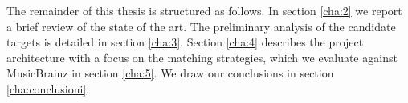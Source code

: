 The remainder of this thesis is structured as follows. In section \ref{cha:2} we report a brief review of the state of the art. The preliminary analysis of the candidate targets is detailed in section \ref{cha:3}. Section \ref{cha:4} describes the project architecture with a focus on the matching strategies, which we evaluate against MusicBrainz in section \ref{cha:5}. We draw our conclusions in section \ref{cha:conclusioni}.

